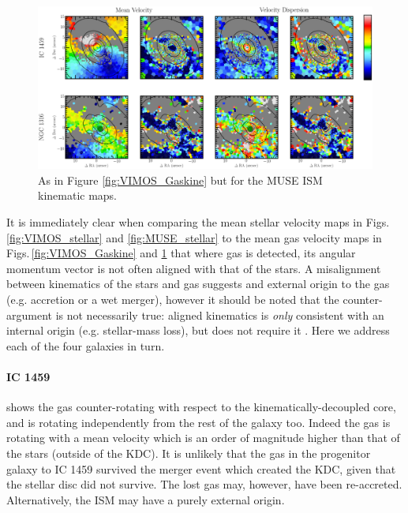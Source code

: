 	\begin{figure}
		\centering
		\includegraphics[height=0.31\textheight]{chapter5/muse/kin.png}
		\caption[MUSE ISM kinematic maps]{As in Figure \ref{fig:VIMOS_Gaskine} but for the MUSE ISM kinematic maps.}
		\label{fig:MUSE_Gaskine}
	\end{figure}


	It is immediately clear when comparing the mean stellar velocity maps in Figs.\,\ref{fig:VIMOS_stellar} and \ref{fig:MUSE_stellar} to the mean gas velocity maps in Figs.\,\ref{fig:VIMOS_Gaskine} and \ref{fig:MUSE_Gaskine} that where gas is detected, its angular momentum vector is not often aligned with that of the stars. A misalignment between kinematics of the stars and gas suggests and external origin to the gas (e.g. accretion or a wet merger), however it should be noted that the counter-argument is not necessarily true: aligned kinematics is \textit{only} consistent with an internal origin (e.g. stellar-mass loss), but does not require it \citep[e.g.][]{Davis2011a}. Here we address each of the four galaxies in turn. 

	\paragraph{IC 1459} shows the gas counter-rotating with respect to the kinematically-decoupled core, and is rotating independently from the rest of the galaxy too. Indeed the gas is rotating with a mean velocity which is an order of magnitude higher than that of the stars (outside of the KDC). It is unlikely that the gas in the progenitor galaxy to IC 1459 survived the merger event which created the KDC, given that the stellar disc did not survive. The lost gas may, however, have been re-accreted. Alternatively, the ISM may have a purely external origin. 

